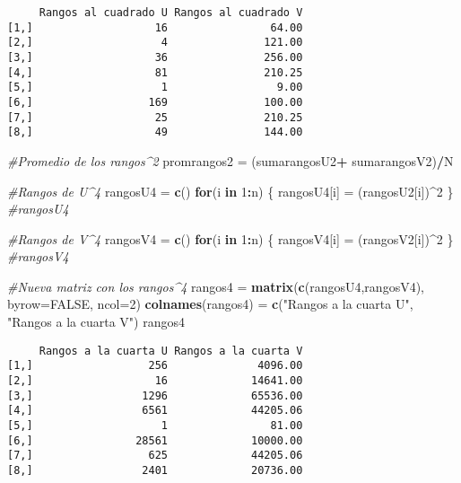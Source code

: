 \documentclass[a4paper,oneside,openany]{book}
\newenvironment{Shaded}{\begin{snugshade}}{\end{snugshade}}
\newcommand{\KeywordTok}[1]{\textcolor[rgb]{0.13,0.29,0.53}{\textbf{#1}}}
\newcommand{\DataTypeTok}[1]{\textcolor[rgb]{0.13,0.29,0.53}{#1}}
\newcommand{\DecValTok}[1]{\textcolor[rgb]{0.00,0.00,0.81}{#1}}
\newcommand{\StringTok}[1]{\textcolor[rgb]{0.31,0.60,0.02}{#1}}
\newcommand{\CommentTok}[1]{\textcolor[rgb]{0.56,0.35,0.01}{\textit{#1}}}
\newcommand{\OtherTok}[1]{\textcolor[rgb]{0.56,0.35,0.01}{#1}}
\newcommand{\ControlFlowTok}[1]{\textcolor[rgb]{0.13,0.29,0.53}{\textbf{#1}}}
\newcommand{\OperatorTok}[1]{\textcolor[rgb]{0.81,0.36,0.00}{\textbf{#1}}}
\newcommand{\NormalTok}[1]{#1}
\begin{document}
\begin{verbatim}
     Rangos al cuadrado U Rangos al cuadrado V
[1,]                   16                64.00
[2,]                    4               121.00
[3,]                   36               256.00
[4,]                   81               210.25
[5,]                    1                 9.00
[6,]                  169               100.00
[7,]                   25               210.25
[8,]                   49               144.00
\end{verbatim}

\begin{Shaded}
\begin{Highlighting}[]
\CommentTok{#Promedio de los rangos^2}
\NormalTok{promrangos2 =}\StringTok{ }\NormalTok{(sumarangosU2}\OperatorTok{+}\StringTok{ }\NormalTok{sumarangosV2)}\OperatorTok{/}\NormalTok{N}

\CommentTok{#Rangos de U^4}
\NormalTok{rangosU4 =}\StringTok{ }\KeywordTok{c}\NormalTok{()}
\ControlFlowTok{for}\NormalTok{(i }\ControlFlowTok{in} \DecValTok{1}\OperatorTok{:}\NormalTok{n) \{}
\NormalTok{  rangosU4[i] =}\StringTok{ }\NormalTok{(rangosU2[i])}\OperatorTok{^}\DecValTok{2}
\NormalTok{\}}
\CommentTok{#rangosU4}

\CommentTok{#Rangos de V^4}
\NormalTok{rangosV4 =}\StringTok{ }\KeywordTok{c}\NormalTok{()}
\ControlFlowTok{for}\NormalTok{(i }\ControlFlowTok{in} \DecValTok{1}\OperatorTok{:}\NormalTok{n) \{}
\NormalTok{  rangosV4[i] =}\StringTok{ }\NormalTok{(rangosV2[i])}\OperatorTok{^}\DecValTok{2}
\NormalTok{\}}
\CommentTok{#rangosV4}

\CommentTok{#Nueva matriz con los rangos^4}
\NormalTok{rangos4 =}\StringTok{ }\KeywordTok{matrix}\NormalTok{(}\KeywordTok{c}\NormalTok{(rangosU4,rangosV4), }\DataTypeTok{byrow=}\OtherTok{FALSE}\NormalTok{, }\DataTypeTok{ncol=}\DecValTok{2}\NormalTok{)}
\KeywordTok{colnames}\NormalTok{(rangos4) =}\StringTok{ }\KeywordTok{c}\NormalTok{(}\StringTok{"Rangos a la cuarta U"}\NormalTok{, }\StringTok{"Rangos a la cuarta V"}\NormalTok{)}
\NormalTok{rangos4}
\end{Highlighting}
\end{Shaded}

\begin{verbatim}
     Rangos a la cuarta U Rangos a la cuarta V
[1,]                  256              4096.00
[2,]                   16             14641.00
[3,]                 1296             65536.00
[4,]                 6561             44205.06
[5,]                    1                81.00
[6,]                28561             10000.00
[7,]                  625             44205.06
[8,]                 2401             20736.00
\end{verbatim}
\end{document}
